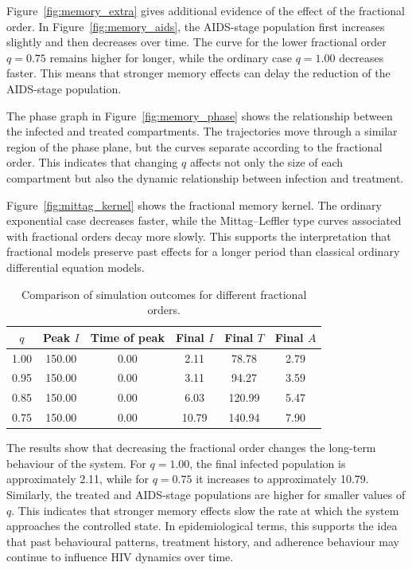 \documentclass[12pt,a4paper,oneside]{report}
\begin{document}
Figure~\ref{fig:memory_extra} gives additional evidence of the effect of the fractional order. In Figure~\ref{fig:memory_aids}, the AIDS-stage population first increases slightly and then decreases over time. The curve for the lower fractional order $q=0.75$ remains higher for longer, while the ordinary case $q=1.00$ decreases faster. This means that stronger memory effects can delay the reduction of the AIDS-stage population.

The phase graph in Figure~\ref{fig:memory_phase} shows the relationship between the infected and treated compartments. The trajectories move through a similar region of the phase plane, but the curves separate according to the fractional order. This indicates that changing $q$ affects not only the size of each compartment but also the dynamic relationship between infection and treatment.

Figure~\ref{fig:mittag_kernel} shows the fractional memory kernel. The ordinary exponential case decreases faster, while the Mittag--Leffler type curves associated with fractional orders decay more slowly. This supports the interpretation that fractional models preserve past effects for a longer period than classical ordinary differential equation models.

\begin{table}[H]
\centering
\caption{Comparison of simulation outcomes for different fractional orders.}
\label{tab:memory_results}
\begin{tabular}{cccccc}
\toprule
$q$ & Peak $I$ & Time of peak & Final $I$ & Final $T$ & Final $A$\\
\midrule
1.00 & 150.00 & 0.00 & 2.11 & 78.78 & 2.79\\
0.95 & 150.00 & 0.00 & 3.11 & 94.27 & 3.59\\
0.85 & 150.00 & 0.00 & 6.03 & 120.99 & 5.47\\
0.75 & 150.00 & 0.00 & 10.79 & 140.94 & 7.90\\
\bottomrule
\end{tabular}
\end{table}

The results show that decreasing the fractional order changes the long-term behaviour of the system. For $q=1.00$, the final infected population is approximately 2.11, while for $q=0.75$ it increases to approximately 10.79. Similarly, the treated and AIDS-stage populations are higher for smaller values of $q$. This indicates that stronger memory effects slow the rate at which the system approaches the controlled state. In epidemiological terms, this supports the idea that past behavioural patterns, treatment history, and adherence behaviour may continue to influence HIV dynamics over time.
\end{document}
